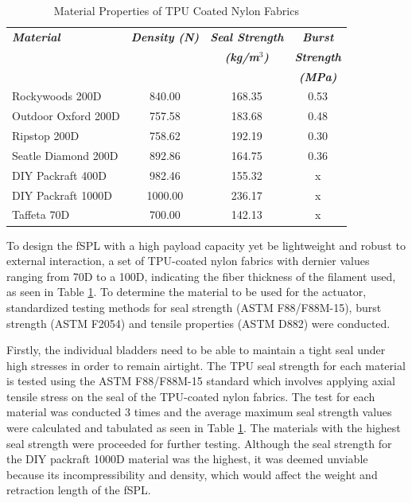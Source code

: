 \documentclass[letterpaper, 10 pt, conference]{ieeeconf}  %
\begin{document}
\begin{table}[t!]
\caption{Material Properties of TPU Coated Nylon Fabrics} 
\label{tab:materialproperty_table}
	\begin{tabularx}{0.48\textwidth}{l|c|c|c}   \toprule\toprule
    \centering
    \small
    \setlength\tabcolsep{11pt}
	\textbf{\emph{Material}} & \textbf{\emph{Density (N) }} & \textbf{\emph{Seal Strength}} & \textbf{\emph{Burst }} \\[-1pt]
                             &                              & \textbf{\emph{(kg/m$^3$)}} & \textbf{\emph{Strength}}\\
                             &                              &                            & \textbf{\emph{(MPa)}}\\\midrule
	Rockywoods 200D &840.00 &168.35 & 0.53 \\
    Outdoor Oxford 200D  &757.58 &  183.68 & 0.48\\
    Ripstop 200D &758.62 & 192.19 & 0.30\\
    Seatle Diamond 200D &892.86 & 164.75 & 0.36\\
    DIY Packraft 400D & 982.46& 155.32 & x\\
    DIY Packraft 1000D &1000.00 & 236.17 & x\\
    Taffeta 70D &700.00& 142.13 & x\\\bottomrule 
    \hline
	\end{tabularx}
\end{table}

To design the fSPL with a high payload capacity yet be lightweight and robust to external interaction, a set of TPU-coated nylon fabrics with dernier values ranging from 70D to a 100D, indicating the fiber thickness of the filament used, as seen in Table \ref{tab:materialproperty_table}. To determine the material to be used for the actuator, standardized testing methods for seal strength (ASTM F88/F88M-15), burst strength (ASTM F2054) and tensile properties (ASTM D882) were conducted.

Firstly, the individual bladders need to be able to maintain a tight seal under high stresses in order to remain airtight. The TPU seal strength for each material is tested using the ASTM F88/F88M-15 standard which involves applying axial tensile stress on the seal of the TPU-coated nylon fabrics. The test for each material was conducted 3 times and the average maximum seal strength values were calculated and tabulated as seen in Table \ref{tab:materialproperty_table}. The materials with the highest seal strength were proceeded for further testing. Although the seal strength for the DIY packraft 1000D material was the highest, it was deemed unviable because its incompressibility and density, which would affect the weight and retraction length of the fSPL.  
\end{document}
